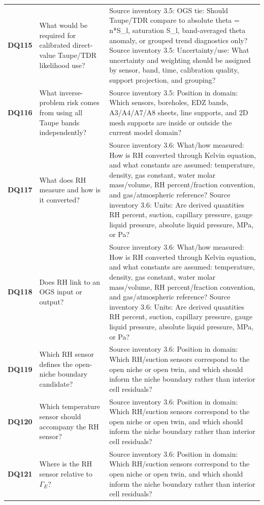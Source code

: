 \begin{longtable}{@{}L{0.09\textwidth} L{0.31\textwidth} L{0.52\textwidth}@{}}
\addlinespace[0.18em]
\textbf{DQ115} & What would be required for calibrated direct-value Taupe/TDR likelihood use? & Source inventory 3.5: OGS tie: Should Taupe/TDR compare to absolute theta = n*S\_l, saturation S\_l, band-averaged theta anomaly, or grouped trend diagnostics only? Source inventory 3.5: Uncertainty/use: What uncertainty and weighting should be assigned by sensor, band, time, calibration quality, support projection, and grouping?\\
\addlinespace[0.18em]
\textbf{DQ116} & What inverse-problem risk comes from using all Taupe bands independently? & Source inventory 3.5: Position in domain: Which sensors, boreholes, EDZ bands, A3/A4/A7/A8 sheets, line supports, and 2D mesh supports are inside or outside the current model domain?\\
\addlinespace[0.18em]
\textbf{DQ117} & What does RH measure and how is it converted? & Source inventory 3.6: What/how measured: How is RH converted through Kelvin equation, and what constants are assumed: temperature, density, gas constant, water molar mass/volume, RH percent/fraction convention, and gas/atmospheric reference? Source inventory 3.6: Units: Are derived quantities RH percent, suction, capillary pressure, gauge liquid pressure, absolute liquid pressure, MPa, or Pa?\\
\addlinespace[0.18em]
\textbf{DQ118} & Does RH link to an OGS input or output? & Source inventory 3.6: What/how measured: How is RH converted through Kelvin equation, and what constants are assumed: temperature, density, gas constant, water molar mass/volume, RH percent/fraction convention, and gas/atmospheric reference? Source inventory 3.6: Units: Are derived quantities RH percent, suction, capillary pressure, gauge liquid pressure, absolute liquid pressure, MPa, or Pa?\\
\addlinespace[0.18em]
\textbf{DQ119} & Which RH sensor defines the open-niche boundary candidate? & Source inventory 3.6: Position in domain: Which RH/suction sensors correspond to the open niche or open twin, and which should inform the niche boundary rather than interior cell residuals?\\
\addlinespace[0.18em]
\textbf{DQ120} & Which temperature sensor should accompany the RH sensor? & Source inventory 3.6: Position in domain: Which RH/suction sensors correspond to the open niche or open twin, and which should inform the niche boundary rather than interior cell residuals?\\
\addlinespace[0.18em]
\textbf{DQ121} & Where is the RH sensor relative to \(\Gamma_E\)? & Source inventory 3.6: Position in domain: Which RH/suction sensors correspond to the open niche or open twin, and which should inform the niche boundary rather than interior cell residuals?\\

\end{longtable}
